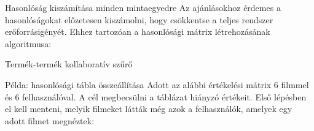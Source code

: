 \documentclass[english, aspectratio=169]{beamer}
\begin{document}
\begin{frame}{Hasonlóság kiszámítása minden mintaegyedre}
Az ajánlásokhoz érdemes a hasonlóságokat előzetesen kiszámolni, hogy csökkentse a teljes rendszer erőforrásigényét. Ehhez tartozóan a hasonlósági mátrix létrehozásának algoritmusa:
\begin{algorithm}[H]
\caption{Termék-termék kollaboratív szűrő}
\SetAlgoLined
\end{algorithm}
\end{frame}

\begin{frame}{Példa: hasonlósági tábla összeállítása}
Adott az alábbi értékelési mátrix 6 filmmel és 6 felhasználóval. A cél megbecsülni a táblázat hiányzó értékeit. Első lépésben el kell menteni, melyik filmeket látták még azok a felhasználók, amelyek egy adott filmet megnéztek:
\end{frame}
\end{document}
